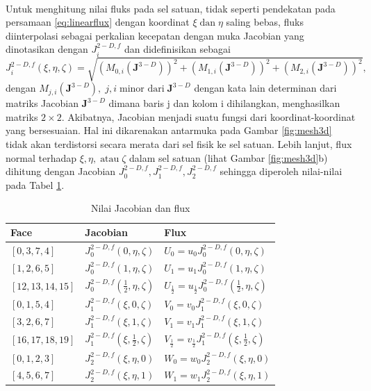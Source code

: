 \begin{spacing}{1.5}
\begin{equation*}
\begin{aligned}
		\end{aligned}	
	\end{equation*}
	Untuk menghitung nilai fluks pada sel satuan, tidak seperti pendekatan pada persamaan \ref{eq:linearflux} dengan koordinat $\xi \; \text{dan} \; \eta$ saling bebas, fluks diinterpolasi sebagai perkalian kecepatan dengan muka Jacobian yang dinotasikan dengan $J_i^{2-D,f}$ dan didefinisikan sebagai 
	\begin{equation}
		J_i^{2-D,f}(\xi,\eta,\zeta)=\sqrt{(M_{0,i}(\textbf{J}^{3-D}))^2+(M_{1,i}(\textbf{J}^{3-D}))^2+(M_{2,i}(\textbf{J}^{3-D}))^2},
	\end{equation}
	dengan $M_{j,i}(\textbf{J}^{3-D}),\; j,i \; \text{minor dari}\; \textbf{J}^{3-D}$ dengan kata lain determinan dari matriks Jacobian $\textbf{J}^{3-D}$ dimana baris j dan kolom i dihilangkan, menghasilkan matriks $2\times2$. Akibatnya, Jacobian menjadi suatu fungsi dari koordinat-koordinat yang bersesuaian. Hal ini dikarenakan antarmuka pada Gambar \ref{fig:mesh3d} tidak akan terdistorsi secara merata dari sel fisik ke sel satuan. Lebih lanjut, flux normal terhadap $\xi,\eta,\; \text{atau}\; \zeta$ dalam sel satuan (lihat Gambar \ref{fig:mesh3d}b) dihitung dengan Jacobian $J_0^{2-D,f},J_1^{2-D,f},J_2^{2-D,f}$ sehingga diperoleh nilai-nilai pada Tabel \ref{table:flux_interp}.
	\begin{table}[htp]
	\centering
	\caption{Nilai Jacobian dan flux}
	\label{table:flux_interp}
		\begin{tabular}{lll}
			Face & Jacobian & Flux \\ \hline
			$[0,3,7,4]$ & $J_0^{2-D,f}(0,\eta,\zeta)$ & $U_0=u_0 J_0^{2-D,f}(0,\eta,\zeta)$ \\
			$[1,2,6,5]$ & $J_0^{2-D,f}(1,\eta,\zeta)$ & $U_1=u_1 J_0^{2-D,f}(1,\eta,\zeta)$  \\
			$[12,13,14,15]$ & $J_0^{2-D,f}(\frac{1}{2},\eta,\zeta)$ & $U_\frac{1}{2}=u_\frac{1}{2} J_0^{2-D,f}(\frac{1}{2},\eta,\zeta)$  \\
			$[0,1,5,4]$ & $J_1^{2-D,f}(\xi,0,\zeta)$ & $V_0=v_0 J_1^{2-D,f}(\xi,0,\zeta)$  \\
			$[3,2,6,7]$ & $J_1^{2-D,f}(\xi,1,\zeta)$ & $V_1=v_1 J_1^{2-D,f}(\xi,1,\zeta)$  \\
			$[16,17,18,19]$ & $J_1^{2-D,f}(\xi,\frac{1}{2},\zeta)$ & $V_\frac{1}{2}=v_\frac{1}{2} J_1^{2-D,f}(\xi,\frac{1}{2},\zeta)$  \\
			$[0,1,2,3]$ & $J_2^{2-D,f}(\xi,\eta,0)$ & $W_0=w_0 J_2^{2-D,f}(\xi,\eta,0)$  \\
			$[4,5,6,7]$ & $J_2^{2-D,f}(\xi,\eta,1)$ & $W_1=w_1 J_2^{2-D,f}(\xi,\eta,1)$  \\

\end{tabular}
\end{table}
\end{spacing}
